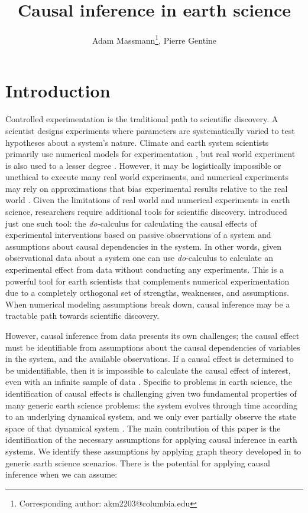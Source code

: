 \documentclass[12pt]{article}
\begin{document}
\title{Causal inference in earth science}

\author{Adam Massmann\thanks{Corresponding author:
    akm2203@columbia.edu}, Pierre Gentine}

\maketitle

\section{Introduction}

Controlled experimentation is the traditional path to scientific
discovery. A scientist designs experiments where parameters are
systematically varied to test hypotheses about a system's
nature. Climate and earth system scientists primarily use numerical
models for experimentation \citep[e.g.,][]{eyring-cmip6-2016}, but
real world experiment is also used to a lesser degree
\citep[e.g.,][]{ainsworth-face-2005}. However, it may be logistically
impossible or unethical to execute many real world experiments, and
numerical experiments may rely on approximations that bias
experimental results relative to the real world
\citep[e.g.,][]{kim-cmip5,stillmann-cmip5-extremes}. Given the
limitations of real world and numerical experiments in earth science,
researchers require additional tools for scientific discovery.
\citet{pearl-1994-do-calculus} introduced just one such tool: the
\textit{do-}calculus for calculating the causal effects of
experimental interventions based on passive observations of a system
and assumptions about causal dependencies in the system. In other
words, given observational data about a system one can use
\textit{do}-calculus to calculate an experimental effect from data
without conducting any experiments. This is a powerful tool for earth
scientists that complements numerical experimentation due to a
completely orthogonal set of strengths, weaknesses, and
assumptions. When numerical modeling assumptions break down, causal
inference may be a tractable path towards scientific discovery.

However, causal inference from data presents its own challenges; the
causal effect must be identifiable from assumptions about the causal
dependencies of variables in the system, and the available
observations. If a causal effect is determined to be unidentifiable,
then it is impossible to calculate the causal effect of interest, even
with an infinite sample of data \citep[][]{shpitser2006}. Specific to
problems in earth science, the identification of causal effects is
challenging given two fundamental properties of many generic earth
science problems: the system evolves through time according to an
underlying dynamical system, and we only ever partially observe the
state space of that dynamical system \citep{majda-state}. The main
contribution of this paper is the identification of the necessary
assumptions for applying causal inference in earth systems. We
identify these assumptions by applying graph theory developed in
\citep{pearl1995causal} to generic earth science scenarios. There is
the potential for applying causal inference when we can assume:
\end{document}

